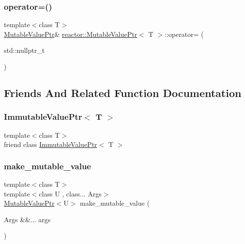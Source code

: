 \subsubsection{\texorpdfstring{operator=()}{operator=()}}
{\footnotesize\ttfamily template$<$class T$>$ \\
\hyperlink{classreactor_1_1MutableValuePtr}{Mutable\+Value\+Ptr}\& \hyperlink{classreactor_1_1MutableValuePtr}{reactor\+::\+Mutable\+Value\+Ptr}$<$ T $>$\+::operator= (\begin{DoxyParamCaption}\item[{std\+::nullptr\+\_\+t}]{ }\end{DoxyParamCaption})\hspace{0.3cm}{\ttfamily [inline]}}



\subsection{Friends And Related Function Documentation}
\mbox{\label{classreactor_1_1MutableValuePtr_a4308f7dd79d565a0aa8bfb1375caa412}} 
\subsubsection{\texorpdfstring{Immutable\+Value\+Ptr$<$ T $>$}{ImmutableValuePtr< T >}}
{\footnotesize\ttfamily template$<$class T$>$ \\
friend class \hyperlink{classreactor_1_1ImmutableValuePtr}{Immutable\+Value\+Ptr}$<$ T $>$\hspace{0.3cm}{\ttfamily [friend]}}

\mbox{\label{classreactor_1_1MutableValuePtr_ace4c49f73d7fc11f60f4979c5b1efbd2}} 
\subsubsection{\texorpdfstring{make\+\_\+mutable\+\_\+value}{make\_mutable\_value}}
{\footnotesize\ttfamily template$<$class T$>$ \\
template$<$class U , class... Args$>$ \\
\hyperlink{classreactor_1_1MutableValuePtr}{Mutable\+Value\+Ptr}$<$U$>$ make\+\_\+mutable\+\_\+value (\begin{DoxyParamCaption}\item[{Args \&\&...}]{args }\end{DoxyParamCaption})\hspace{0.3cm}{\ttfamily [friend]}}



